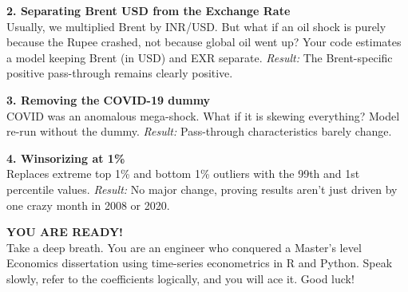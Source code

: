 \documentclass[12pt,a4paper]{report}
\begin{document}
\textbf{2. Separating Brent USD from the Exchange Rate}\\
Usually, we multiplied Brent by INR/USD. But what if an oil shock is purely because the Rupee crashed, not because global oil went up? Your code estimates a model keeping Brent (in USD) and EXR separate. \textit{Result:} The Brent-specific positive pass-through remains clearly positive.

\textbf{3. Removing the COVID-19 dummy}\\
COVID was an anomalous mega-shock. What if it is skewing everything? Model re-run without the dummy. \textit{Result:} Pass-through characteristics barely change.

\textbf{4. Winsorizing at 1\%}\\
Replaces extreme top 1\% and bottom 1\% outliers with the 99th and 1st percentile values. \textit{Result:} No major change, proving results aren't just driven by one crazy month in 2008 or 2020.


\vspace{2cm}
\begin{center}
\textbf{\Large YOU ARE READY!} \\
\vspace{0.5cm}
Take a deep breath. You are an engineer who conquered a Master's level Economics dissertation using time-series econometrics in R and Python. Speak slowly, refer to the coefficients logically, and you will ace it. Good luck!
\end{center}
\end{document}
